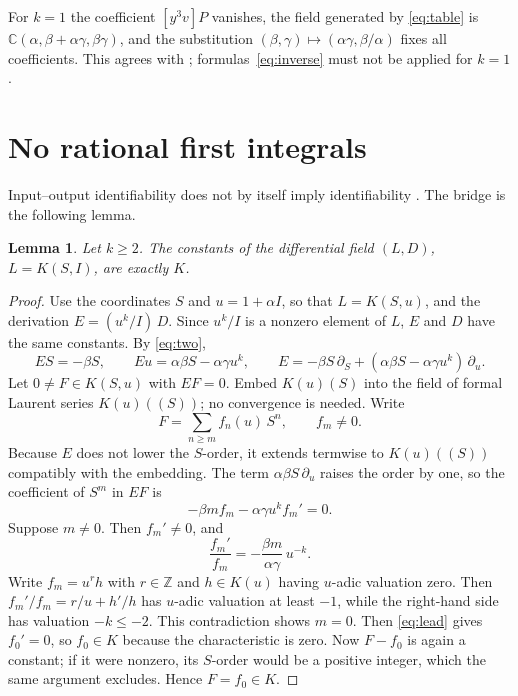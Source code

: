 \documentclass[10pt,a4paper]{article}
\newtheorem{lemma}[theorem]{Lemma}
\theoremstyle{definition}
\theoremstyle{remark}
\newcommand{\C}{\mathbb C}
\newcommand{\coef}[1]{[#1]P}
\begin{document}
For $k=1$ the coefficient $\coef{y^3v}$ vanishes, the field generated by
\eqref{eq:table} is $\C(\alpha,\beta+\alpha\gamma,\beta\gamma)$, and the
substitution $(\beta,\gamma)\mapsto(\alpha\gamma,\beta/\alpha)$ fixes all
coefficients. This agrees with \cite[Theorem~3.8]{PSP};
formulas~\eqref{eq:inverse} must not be applied for $k=1$.

\section{No rational first integrals}
\label{sec:noint}
Input--output identifiability does not by itself imply identifiability
\cite[Example~4.8]{OPT}. The bridge is the following lemma.

\begin{lemma}
\label{lem:noint}
Let $k\geq2$. The constants of the
differential field $(L,D)$, $L=K(S,I)$, are exactly $K$.
\end{lemma}

\begin{proof}
Use the coordinates $S$ and $u=1+\alpha I$, so that $L=K(S,u)$, and the
derivation $E=(u^k/I)\,D$. Since $u^k/I$ is a nonzero element of $L$,
$E$ and $D$ have the same constants. By \eqref{eq:two},
\begin{equation}
 ES=-\beta S,\qquad Eu=\alpha\beta S-\alpha\gamma u^k,
 \qquad
 E=-\beta S\,\partial_S+(\alpha\beta S-\alpha\gamma u^k)\,\partial_u .
 \label{eq:E}
\end{equation}
Let $0\neq F\in K(S,u)$ with $EF=0$. Embed $K(u)(S)$ into the field of
formal Laurent series $K(u)((S))$; no convergence is needed. Write
\[
 F=\sum_{n\geq m} f_n(u)\,S^n,\qquad f_m\neq0 .
\]
Because $E$ does not lower the $S$-order, it extends termwise to
$K(u)((S))$ compatibly with the embedding. The term $\alpha\beta
S\,\partial_u$ raises the order by one, so the coefficient of $S^m$ in
$EF$ is
\begin{equation}
 -\beta m f_m-\alpha\gamma u^k f_m'=0 .
 \label{eq:lead}
\end{equation}
Suppose $m\neq0$. Then $f_m'\neq0$, and
\[
 \frac{f_m'}{f_m}=-\frac{\beta m}{\alpha\gamma}\,u^{-k}.
\]
Write $f_m=u^r h$ with $r\in\mathbb Z$ and $h\in K(u)$ having $u$-adic
valuation zero. Then $f_m'/f_m=r/u+h'/h$ has $u$-adic valuation at least
$-1$, while the right-hand side has valuation $-k\leq-2$. This
contradiction shows $m=0$. Then \eqref{eq:lead} gives $f_0'=0$, so
$f_0\in K$ because the characteristic is zero. Now $F-f_0$ is again a
constant; if it were nonzero, its $S$-order would be a positive integer,
which the same argument excludes. Hence $F=f_0\in K$.
\end{proof}
\end{document}
